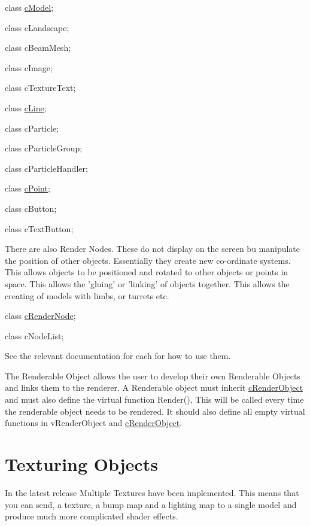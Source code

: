class \hyperlink{classc_model}{cModel}; \par
 class cLandscape; \par
 class cBeamMesh; \par
 class cImage; \par
 class cTextureText; \par
 class \hyperlink{classc_line}{cLine}; \par
 class cParticle; \par
 class cParticleGroup; \par
 class cParticleHandler; \par
 class \hyperlink{classc_point}{cPoint}; \par
 class cButton; \par
 class cTextButton; \par
 \par
 There are also Render Nodes. These do not display on the screen bu manipulate the position of other objects. Essentially they create new co-\/ordinate systems. This allows objects to be positioned and rotated to other objects or points in space. This allows the 'gluing' or 'linking' of objects together. This allows the creating of models with limbs, or turrets etc. \par
 class \hyperlink{classc_render_node}{cRenderNode}; \par
 class cNodeList; \par
 \par
 See the relevant documentation for each for how to use them. \par
 \par
 The Renderable Object allows the user to develop their own Renderable Objects and links them to the renderer. A Renderable object must inherit \hyperlink{classc_render_object}{cRenderObject} and must also define the virtual function Render(), This will be called every time the renderable object needs to be rendered. It should also define all empty virtual functions in vRenderObject and \hyperlink{classc_render_object}{cRenderObject}.\hypertarget{_using_engine_page_MultiTexturing}{}\section{Texturing Objects}\label{_using_engine_page_MultiTexturing}
In the latest release Multiple Textures have been implemented. This means that you can send, a texture, a bump map and a lighting map to a single model and produce much more complicated shader effects. \par
